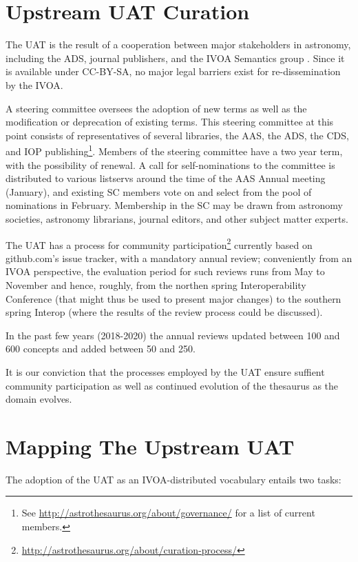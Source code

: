 \documentclass[11pt,a4paper]{ivoa}
\begin{document}
\section{Upstream UAT Curation}

The UAT is the result of a cooperation between major stakeholders in
astronomy, including the ADS, journal publishers, and the IVOA Semantics
group \citep{2014ASPC..485..461A}.  Since it is available under CC-BY-SA, 
no major legal barriers exist for re-dissemination by the IVOA.

A steering committee oversees the adoption of new terms as well as the
modification or deprecation of existing terms.  This steering committee
at this point consists of representatives of several libraries, the AAS,
the ADS, the CDS, and IOP publishing\footnote{See
\url{http://astrothesaurus.org/about/governance/} for a list of current
members.}.  Members of the steering committee have a two year term, with
the possibility of renewal.  A call for self-nominations to the
committee is distributed to various listservs around the time of the AAS
Annual meeting (January), and existing SC members vote on and select
from the pool of nominations in February.  Membership in the SC may be
drawn from astronomy societies, astronomy librarians, journal editors,
and other subject matter experts.

The UAT has a process for community
participation\footnote{\url{http://astrothesaurus.org/about/curation-process/}}
currently based on github.com's issue tracker, with a mandatory annual
review; conveniently from an IVOA perspective, the evaluation period for
such reviews runs from May to November and hence, roughly, from the
northen spring Interoperability Conference (that 
might thus be used to present major
changes) to the southern spring Interop (where the results of the review
process could be discussed).

In the past few years (2018-2020) the annual reviews updated between 100
and 600 concepts and added between 50 and 250.

It is our conviction that the processes employed by the UAT ensure
suffient community participation as well as continued evolution of the
thesaurus as the domain evolves.

\section{Mapping The Upstream UAT}

The adoption of the UAT as an IVOA-distributed vocabulary entails two
tasks:
\end{document}
